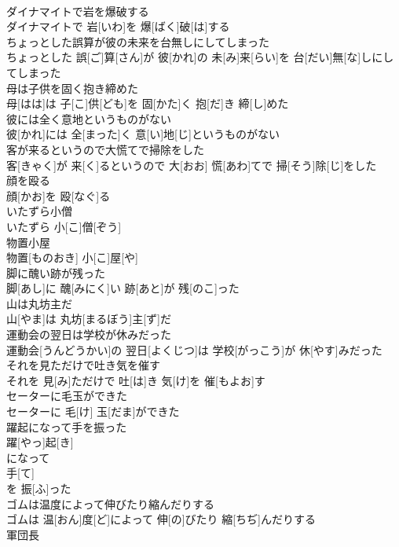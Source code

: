 \documentclass[8pt]{extreport}
\begin{document}
\begin{CJK}{UTF8}{min}
\\	ダイナマイトで岩を爆破する	
\\	ダイナマイトで 岩[いわ]を 爆[ばく]破[は]する
\\	ちょっとした誤算が彼の未来を台無しにしてしまった	
\\	ちょっとした 誤[ご]算[さん]が 彼[かれ]の 未[み]来[らい]を 台[だい]無[な]しにしてしまった
\\	母は子供を固く抱き締めた	
\\	母[はは]は 子[こ]供[ども]を 固[かた]く 抱[だ]き 締[し]めた
\\	彼には全く意地というものがない	
\\	彼[かれ]には 全[まった]く 意[い]地[じ]というものがない
\\	客が来るというので大慌てで掃除をした	
\\	客[きゃく]が 来[く]るというので 大[おお] 慌[あわ]てで 掃[そう]除[じ]をした
\\	顔を殴る	
\\	顔[かお]を 殴[なぐ]る
\\	いたずら小僧	
\\	いたずら 小[こ]僧[ぞう]
\\	物置小屋	
\\	物置[ものおき] 小[こ]屋[や]
\\	脚に醜い跡が残った	
\\	脚[あし]に 醜[みにく]い 跡[あと]が 残[のこ]った
\\	山は丸坊主だ	
\\	山[やま]は 丸坊[まるぼう]主[ず]だ
\\	運動会の翌日は学校が休みだった	
\\	運動会[うんどうかい]の 翌日[よくじつ]は 学校[がっこう]が 休[やす]みだった
\\	それを見ただけで吐き気を催す	
\\	それを 見[み]ただけで 吐[は]き 気[け]を 催[もよお]す
\\	セーターに毛玉ができた	
\\	セーターに 毛[け] 玉[だま]ができた
\\	躍起になって手を振った	
\\	躍[やっ]起[き]
\\	になって 
\\	手[て]
\\	を 振[ふ]った 
\\	ゴムは温度によって伸びたり縮んだりする	
\\	ゴムは 温[おん]度[ど]によって 伸[の]びたり 縮[ちぢ]んだりする
\\	軍団長	

\end{CJK}
\end{document}
